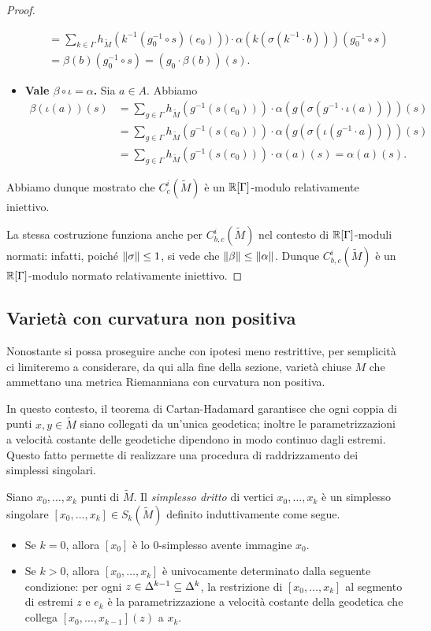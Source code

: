 \begin{proof}
\begin{itemize}
\begin{align*}
&=\sum_{k\in\Gamma}h_{\widetilde M}(k^{-1}(g_0^{-1}\circ s)(e_0)))\cdot\alpha(k(\sigma(k^{-1}\cdot b)))(g_0^{-1}\circ s)\\
&=\beta(b)(g_0^{-1}\circ s)=(g_0\cdot\beta(b))(s).
\end{align*}
\item \textbf{Vale $\beta\circ\iota=\alpha$.} Sia $a\in A$. Abbiamo
\begin{align*}
\beta(\iota(a))(s)&=\sum_{g\in\Gamma}h_{\widetilde M}(g^{-1}(s(e_0)))\cdot \alpha(g(\sigma(g^{-1}\cdot\iota(a))))(s)\\
&=\sum_{g\in\Gamma}h_{\widetilde M}(g^{-1}(s(e_0)))\cdot \alpha(g(\sigma(\iota(g^{-1}\cdot a))))(s)\\
&=\sum_{g\in\Gamma}h_{\widetilde M}(g^{-1}(s(e_0)))\cdot \alpha(a)(s)=\alpha(a)(s).
\end{align*}
\end{itemize}
Abbiamo dunque mostrato che $C^i_c(\widetilde M)$ è un $\mathbb{R}[\Gamma]$-modulo relativamente iniettivo.

La stessa costruzione funziona anche per $C^i_{b,c}(\widetilde M)$ nel contesto di $\mathbb{R}[\Gamma]$-moduli normati: infatti, poiché $\left\lVert \sigma\right\rVert\le 1$, si vede che $\left\lVert \beta\right\rVert\le\left\lVert \alpha\right\rVert$. Dunque $C^i_{b,c}(\widetilde M)$ è un $\mathbb{R}[\Gamma]$-modulo normato relativamente iniettivo.
\end{proof}

\subsection{Varietà con curvatura non positiva}
Nonostante si possa proseguire anche con ipotesi meno restrittive, per semplicità ci limiteremo a considerare, da qui alla fine della sezione, varietà chiuse $M$ che ammettano una metrica Riemanniana con curvatura non positiva.

In questo contesto, il teorema di Cartan-Hadamard garantisce che ogni coppia di punti $x,y\in\widetilde M$ siano collegati da un'unica geodetica; inoltre le parametrizzazioni a velocità costante delle geodetiche dipendono in modo continuo dagli estremi. Questo fatto permette di realizzare una procedura di raddrizzamento dei simplessi singolari.

\begin{definition}
Siano $x_0,\ldots,x_k$ punti di $\widetilde M$. Il \emph{simplesso dritto} di vertici $x_0,\ldots,x_k$ è un simplesso singolare $[x_0,\ldots,x_k]\in S_k(\widetilde M)$ definito induttivamente come segue.
\begin{itemize}
\item Se $k=0$, allora $[x_0]$ è lo $0$-simplesso avente immagine $x_0$.
\item Se $k>0$, allora $[x_0,\ldots,x_k]$ è univocamente determinato dalla seguente condizione: per ogni $z\in\Delta^{k-1}\subseteq\Delta^k$, la restrizione di $[x_0,\ldots,x_k]$ al segmento di estremi $z$ e $e_k$ è la parametrizzazione a velocità costante della geodetica che collega $[x_0,\ldots,x_{k-1}](z)$ a $x_k$.
\end{itemize}
\end{definition}

